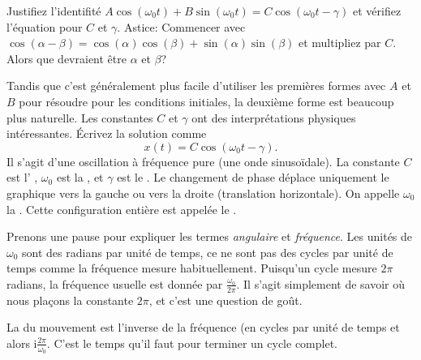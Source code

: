 \begin{exercise}
Justifiez l'identifité  $A \cos (\omega_0 t) + B \sin (\omega_0 t) =
C \cos ( \omega_0 t - \gamma )$ et vérifiez l'équation pour $C$
et $\gamma$.  Astice: Commencer avec  
$\cos (\alpha-\beta) = \cos (\alpha) \cos
(\beta) + \sin (\alpha)\sin (\beta)$ et multipliez par $C$.  Alors que devraient être  
$\alpha$ et $\beta$?
\end{exercise}

Tandis que c'est généralement plus facile d'utiliser les premières formes avec  $A$ et $B$
pour résoudre pour les conditions initiales, la deuxième forme est beaucoup plus naturelle. Les constantes $C$ et $\gamma$ ont des interprétations physiques intéressantes. 
Écrivez la solution comme
\begin{equation*}
x(t) = C \cos ( \omega_0 t - \gamma ) .
\end{equation*}
Il s'agit d'une oscillation à fréquence pure (une onde sinusoïdale).
La constante  $C$ est l' \emph{}, $\omega_0$ est la 
\emph{},
et $\gamma$ est le \emph{}.
Le changement de phase déplace uniquement le graphique vers la gauche ou vers la droite (translation horizontale). 
On appelle $\omega_0$ la \emph{}.
Cette configuration entière est
appelée le \emph{}.

Prenons une pause pour expliquer les termes \emph{angulaire}
et \emph{fréquence}.
Les unités de
$\omega_0$ sont des radians par unité de temps, ce ne sont pas des cycles par unité de temps comme la fréquence mesure habituellement. Puisqu'un cycle mesure $2
\pi$ radians, la fréquence usuelle est donnée par  $\frac{\omega_0}{2\pi}$.
Il s'agit simplement de savoir où nous plaçons la constante $2\pi$, 
et c'est une question de goût.

La \emph{} du mouvement est l'inverse de la fréquence  (en cycles par unité de temps et alors i$\frac{2\pi}{\omega_0}$.  C'est le temps qu'il faut pour terminer un cycle complet.


